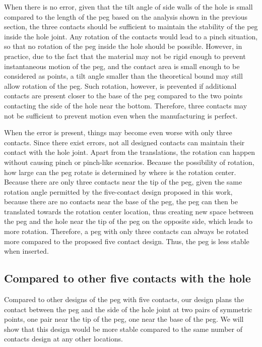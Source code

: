 \documentclass[11pt, twocolumn]{article}
\begin{document}
When there is no error, given that the tilt angle of side walls of the hole is small compared to the length of the peg based on the analysis shown in the previous section, the three contacts should be sufficient to maintain the stability of the peg inside the hole joint. Any rotation of the contacts would lead to a pinch situation, so that no rotation of the peg inside the hole should be possible. However, in practice, due to the fact that the material may not be rigid enough to prevent instantaneous motion of the peg, and the contact area is small enough to be considered as points, a tilt angle smaller than the theoretical bound may still allow rotation of the peg. Such rotation, however, is prevented if additional contacts are present closer to the base of the peg compared to the two points contacting the side of the hole near the bottom. Therefore, three contacts may not be sufficient to prevent motion even when the manufacturing is perfect. 


When the error is present, things may become even worse with only three contacts. Since there exist errors, not all designed contacts can maintain their contact with the hole joint. Apart from the translations, the rotation can happen without causing pinch or pinch-like scenarios. Because the possibility of rotation, how large can the peg rotate is determined by where is the rotation center. Because there are only three contacts near the tip of the peg, given the same rotation angle permitted by the five-contact design proposed in this work, because there are no contacts near the base of the peg, the peg can then be translated towards the rotation center location, thus creating new space between the peg and the hole near the tip of the peg on the opposite side, which leads to more rotation. Therefore, a peg with only three contacts can always be rotated more compared to the proposed five contact design. Thus, the peg is less stable when inserted. 


\subsection{Compared to other five contacts with the hole}


Compared to other designs of the peg with five contacts, our design plans the contact between the peg and the side of the hole joint at two pairs of symmetric points, one pair near the tip of the peg, one near the base of the peg. We will show that this design would be more stable compared to the same number of contacts design at any other locations. 
\end{document}
